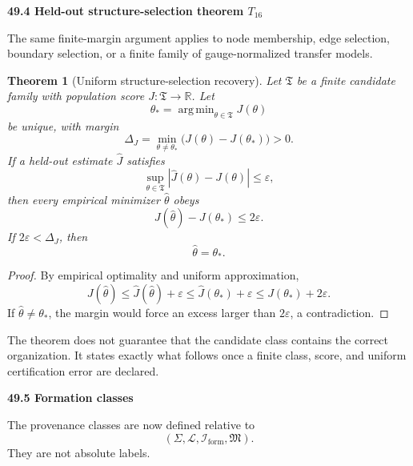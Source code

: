 \documentclass[11pt,letterpaper]{article}
\DeclareMathOperator*{\argmin}{arg\,min}
\newcommand{\subtopic}[1]{%
 \vspace{0.45em}
 {\bfseries\color{AccentColor} #1\par}
}
\theoremstyle{plain}
\newtheorem{theorem}{Theorem}
\theoremstyle{definition}
\begin{document}
\subtopic{49.4 Held-out structure-selection theorem \(T_{16}\) }

The same finite-margin argument applies to node membership, edge selection,
boundary selection, or a finite family of gauge-normalized transfer models.

\begin{theorem}[Uniform structure-selection recovery]
\label{thm:uniform-structure-selection}
Let \(\mathfrak T\) be a finite candidate family with population score
\(J:\mathfrak T\to\mathbb R\). Let
\[
\theta_*
=
\argmin_{\theta\in\mathfrak T}J(\theta)
\]
be unique, with margin
\[
\Delta_J
=
\min_{\theta\neq\theta_*}
\bigl(J(\theta)-J(\theta_*)\bigr)>0.
\]
If a held-out estimate \(\widehat J\) satisfies
\[
\sup_{\theta\in\mathfrak T}
|\widehat J(\theta)-J(\theta)|
\leq\varepsilon,
\]
then every empirical minimizer \(\widehat\theta\) obeys
\[
\boxed{
J(\widehat\theta)-J(\theta_*)
\leq2\varepsilon.
}
\]
If \(2\varepsilon<\Delta_J\), then
\[
\boxed{\widehat\theta=\theta_*.}
\]
\end{theorem}

\begin{proof}
By empirical optimality and uniform approximation,
\[
J(\widehat\theta)
\leq
\widehat J(\widehat\theta)+\varepsilon
\leq
\widehat J(\theta_*)+\varepsilon
\leq
J(\theta_*)+2\varepsilon.
\]
If \(\widehat\theta\neq\theta_*\), the margin would force an excess larger than
\(2\varepsilon\), a contradiction.
\end{proof}

The theorem does not guarantee that the candidate class contains the correct
organization. It states exactly what follows once a finite class, score, and
uniform certification error are declared.

\subtopic{49.5 Formation classes}

The provenance classes are now defined relative to
\[
(\Sigma,\mathcal L,\mathcal I_{\mathrm{form}},\mathfrak M).
\]
They are not absolute labels.
\end{document}
